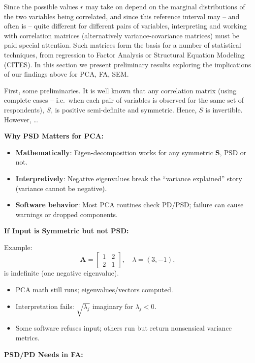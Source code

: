 \documentclass[
  12pt,
]{article}
\providecommand{\tightlist}{%
  \setlength{\itemsep}{0pt}\setlength{\parskip}{0pt}}
\theoremstyle{plain}
\theoremstyle{definition}
\theoremstyle{remark}
\begin{document}
Since the possible values \(r\) may take on depend on the marginal
distributions of the two variables being correlated, and since this
reference interval may -- and often is -- quite different for different
pairs of variables, interpreting and working with correlation matrices
(alternatively variance-covariance matrices) must be paid special
attention. Such matrices form the basis for a number of statistical
techniques, from regression to Factor Analysis or Structural Equation
Modeling (CITES). In this section we present preliminary results
exploring the implications of our findings above for PCA, FA, SEM.

First, some preliminaries. It is well known that any correlation matrix
(using complete cases -- i.e.~when each pair of variables is observed
for the same set of respondents), \(S\), is positive semi-definite and
symmetric. Hence, \(S\) is invertible. However, \ldots{}

\textbf{Why PSD Matters for PCA:}

\begin{itemize}
\tightlist
\item
  \textbf{Mathematically}: Eigen-decomposition works for any symmetric
  \(\mathbf{S}\), PSD or not.
\item
  \textbf{Interpretively}: Negative eigenvalues break the ``variance
  explained'' story (variance cannot be negative).
\item
  \textbf{Software behavior}: Most PCA routines check PD/PSD; failure
  can cause warnings or dropped components.
\end{itemize}

\textbf{If Input is Symmetric but not PSD:}

Example: \[
\mathbf{A} = \begin{bmatrix} 1 & 2 \\ 2 & 1 \end{bmatrix},\quad \lambda = (3,-1),
\] is indefinite (one negative eigenvalue).

\begin{itemize}
\tightlist
\item
  PCA math still runs; eigenvalues/vectors computed.
\item
  Interpretation fails: \(\sqrt{\lambda_j}\) imaginary for
  \(\lambda_j<0\).
\item
  Some software refuses input; others run but return nonsensical
  variance metrics.
\end{itemize}

\textbf{PSD/PD Needs in FA:}
\end{document}

